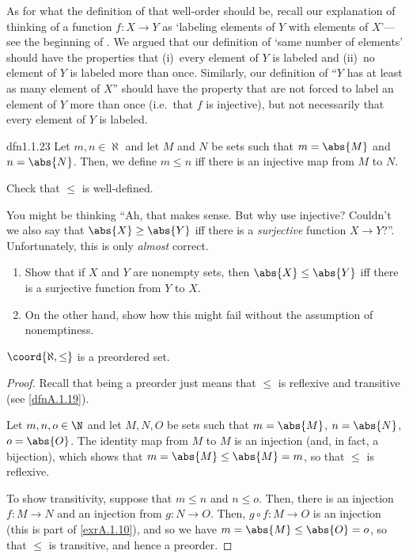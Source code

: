 As for what the definition of that well-order should be, recall our explanation of thinking of a function $f\colon X\rightarrow Y$ as `labeling elements of $Y$ with elements of $X$'---see the beginning of .  We argued that our definition of `same number of elements' should have the properties that (i)~every element of $Y$ is labeled and (ii)~no element of $Y$ is labeled more than once.  Similarly, our definition of ``$Y$ has at least as many element of $X$'' should have the property that are not forced to label an element of $Y$ more than once (i.e.~that $f$ is injective), but not necessarily that every element of $Y$ is labeled.
\begin{dfn}{}{dfn1.1.23}
	Let $m,n\in \aleph$ and let $M$ and $N$ be sets such that $m=\abs{M}$ and $n=\abs{N}$.  Then, we define $m\leq n$ iff there is an injective map from $M$ to $N$.
	\begin{exr}[breakable=false]{}{}
		Check that $\leq$ is well-defined.
	\end{exr}
\end{dfn}
You might be thinking ``Ah, that makes sense.  But why use injective?  Couldn't we also say that $\abs{X}\geq \abs{Y}$ iff there is a \emph{surjective} function $X\rightarrow Y$?''.  Unfortunately, this is only \emph{almost} correct.
\begin{exr}{}{}
	\begin{enumerate}
		\item Show that if $X$ and $Y$ are nonempty sets, then $\abs{X}\leq \abs{Y}$ iff there is a surjective function from $Y$ to $X$.
		\item On the other hand, show how this might fail without the assumption of nonemptiness.
	\end{enumerate}
\end{exr}
\begin{prp}{}{}
	$\coord{\aleph ,\leq}$ is a preordered set.
	\begin{proof}
		Recall that being a preorder just means that $\leq$ is reflexive and transitive (see \cref{dfnA.1.19}).
		
		Let $m,n,o\in \N$ and let $M,N,O$ be sets such that $m=\abs{M}$, $n=\abs{N}$, $o=\abs{O}$.  The identity map from $M$ to $M$ is an injection (and, in fact, a bijection), which shows that $m=\abs{M}\leq \abs{M}=m$, so that $\leq$ is reflexive.
		
		To show transitivity, suppose that $m\leq n$ and $n\leq o$.  Then, there is an injection $f\colon M\rightarrow N$ and an injection from $g\colon N\rightarrow O$.  Then, $g\circ f\colon M\rightarrow O$ is an injection (this is part of \cref{exrA.1.10}), and so we have $m=\abs{M}\leq \abs{O}=o$, so that $\leq$ is transitive, and hence a preorder.
	\end{proof}
\end{prp}
